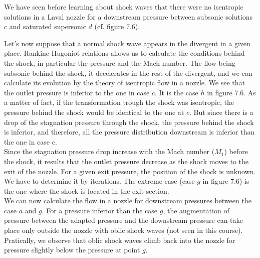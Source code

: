 We have seen before learning about shock waves that there were no isentropic solutions in a Laval nozzle for a downstream pressure between subsonic solutions $c$ and saturated supersonic $d$ (cf. figure 7.6). 

Let's now suppose that a normal shock wave appears in the divergent in a given place. Rankine-Hugoniot relations allows us to calculate the conditions behind the shock, in particular the pressure and the Mach number. The flow being subsonic behind the shock, it decelerates in the rest of the divergent, and we can calculate its evolution by the theory of isentropic flow in a nozzle. We see that the outlet pressure is inferior to the one in case $c$. It is the case $h$ in figure 7.6. As a matter of fact, if the transformation trough the shock was isentropic, the pressure behind the shock would be identical to the one at $c$. But since there is a drop of the stagnation pressure through the shock, the pressure behind the shock is inferior, and therefore, all the pressure distribution downstream is inferior than the one in case c.
\\

Since the stagnation pressure drop increase with the Mach number ($M_1$) before the shock, it results that the outlet pressure decrease as the shock moves to the exit of the nozzle. For a given exit pressure, the position of the shock is unknown. We have to determine it by iterations. The extreme case (case $g$ in figure 7.6) is the one where the shock is located in the exit section.
\\

We can now calculate the flow in a nozzle for downstream pressures between the case $a$ and $g$. For a pressure inferior than the case $g$, the augmentation of pressure between the adapted pressure and the downstream pressure can take place only outside the nozzle with oblic shock waves (not seen in this course). Pratically, we observe that oblic shock waves climb back into the nozzle for pressure slightly below the pressure at point $g$.

